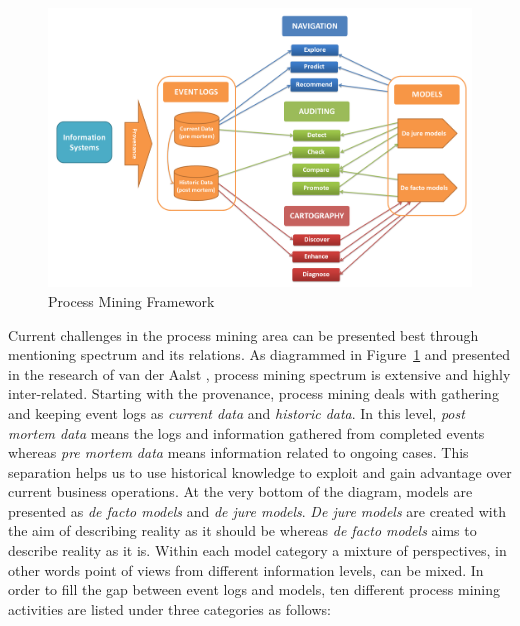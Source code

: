 \begin{figure}
  \centering
  \includegraphics[width=\textwidth]{2_relatedwork/process-mining-spectrum-v2}
  \caption{Process Mining Framework}
  \label{fig:process-mining-spectrum-v2}
\end{figure}

Current challenges in the process mining area can be presented best through mentioning spectrum and its relations. As diagrammed in Figure~\ref{fig:process-mining-spectrum-v2} and presented in the research of van der Aalst \cite{van2011process}, process mining spectrum is extensive and highly inter-related. Starting with the provenance, process mining deals with gathering and keeping event logs as \textit{current data} and \textit{historic data}. In this level, \textit{post mortem data} means the logs and information gathered from completed events whereas \textit{pre mortem data} means information related to ongoing cases. This separation helps us to use historical knowledge to exploit and gain advantage over current business operations. At the very bottom of the diagram, models are presented as \textit{de facto models} and \textit{de jure models}. \textit{De jure models} are created with the aim of describing reality as it should be whereas \textit{de facto models} aims to describe reality as it is. Within each model category a mixture of perspectives, in other words point of views from different information levels, can be mixed. In order to fill the gap between event logs and models, ten different process mining activities are listed under three categories \cite{van2011process} as follows:


